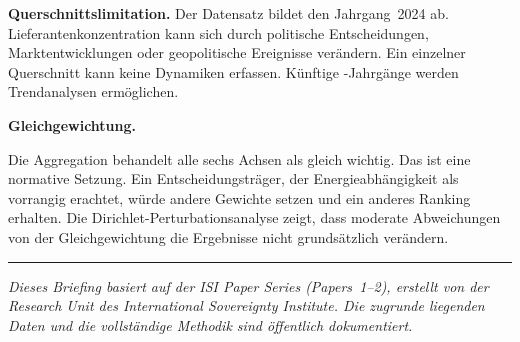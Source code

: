 \begin{sloppypar}
\textbf{Querschnitts\-limitation.}
Der Datensatz bildet den Jahrgang~2024 ab.
Lieferanten\-konzentration kann sich durch politische
Entscheidungen, Markt\-entwicklungen oder geopolitische Ereignisse
ver\"andern.  Ein einzelner Querschnitt kann keine Dynamiken
erfassen.  K\"unftige \ISI-Jahrg\"ange werden Trend\-analysen
erm\"oglichen.
\end{sloppypar}

\textbf{Gleichgewichtung.}
\begin{sloppypar}
Die Aggregation behandelt alle sechs Achsen als gleich wichtig.
Das ist eine normative Setzung.  Ein Entscheidungs\-tr\"ager, der
Energie\-abh\"angigkeit als vorrangig erachtet, w\"urde andere
Gewichte setzen und ein anderes Ranking erhalten.  Die
Dirichlet-Perturbations\-analyse zeigt, dass moderate Abweichungen
von der Gleichgewichtung die Ergebnisse nicht grunds\"atzlich
ver\"andern.
\end{sloppypar}

\vfill
\begin{center}
\rule{0.4\linewidth}{0.4pt}
\end{center}
\smallskip
\noindent\textit{Dieses Briefing basiert auf der ISI Paper Series
(Papers~1--2), erstellt von der Research Unit des International
Sovereignty Institute.  Die zugrunde liegenden Daten und die
vollst\"andige Methodik sind \"offentlich dokumentiert.}
